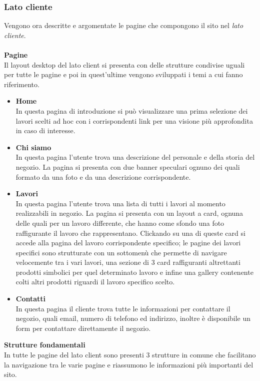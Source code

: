 \subsubsection{Lato cliente}
Vengono ora descritte e argomentate le pagine che compongono il sito nel \textit{lato cliente}.\\\\
\textbf{Pagine}\\
Il layout desktop del lato client si presenta con delle strutture condivise uguali per tutte le pagine e poi in quest'ultime vengono sviluppati i temi a cui fanno riferimento.
	\begin{itemize}
		\item \textbf{Home} \\In questa pagina di introduzione si può visualizzare una prima selezione dei lavori scelti ad hoc con i corrispondenti link per una visione più approfondita in caso di interesse.
		\item \textbf{Chi siamo}\\In questa pagina l'utente trova una descrizione del personale e della storia del negozio. La pagina si presenta con due banner speculari ognuno dei quali formato da una foto e da una descrizione corrispondente.
		\item \textbf{Lavori}\\In questa pagina l'utente trova una lista di tutti i lavori al momento realizzabili in negozio. La pagina si presenta con un layout a card, ognuna delle quali per un lavoro differente, che hanno come sfondo una foto raffigurante il lavoro che rappresentano. Clickando su una di queste card si accede alla pagina del lavoro corrispondente specifico; le pagine dei lavori specifici sono strutturate con un sottomenù che permette di navigare velocemente tra i vari lavori, una sezione di 3 card raffiguranti altrettanti prodotti simbolici per quel determinato lavoro e infine una gallery contenente colti altri prodotti riguardi il lavoro specifico scelto.
	 	\item \textbf{Contatti}\\In questa pagina il cliente trova tutte le informazioni per contattare il negozio, quali email, numero di telefono ed indirizzo, inoltre è disponibile un form per contattare direttamente il negozio.
 	\end{itemize}
\textbf{Strutture fondamentali}\\ 
In tutte le pagine del lato client sono presenti 3 strutture in comune che facilitano la navigazione tra le varie pagine e riassumono le informazioni più importanti del sito.

